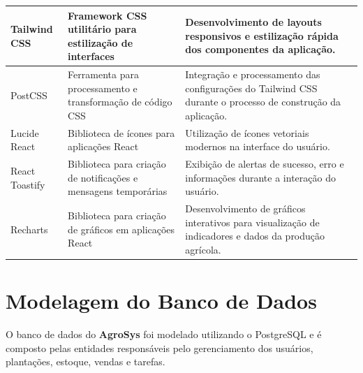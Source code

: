 \documentclass[12pt]{article}
\begin{document}
\begin{longtable}{|p{3cm}|p{4.2cm}|p{7cm}|}
  Tailwind CSS                                                                           &
  Framework CSS utilitário para estilização de interfaces                                &
  Desenvolvimento de layouts responsivos e estilização rápida dos componentes da aplicação.                                                    \\
  \hline

  PostCSS                                                                                &
  Ferramenta para processamento e transformação de código CSS                            &
  Integração e processamento das configurações do Tailwind CSS durante o processo de construção da aplicação.                                  \\
  \hline

  Lucide React                                                                           &
  Biblioteca de ícones para aplicações React                                             &
  Utilização de ícones vetoriais modernos na interface do usuário.                                                                             \\
  \hline

  React Toastify                                                                         &
  Biblioteca para criação de notificações e mensagens temporárias                        &
  Exibição de alertas de sucesso, erro e informações durante a interação do usuário.                                                           \\
  \hline

  Recharts                                                                         &
  Biblioteca para criação de gráficos em aplicações React                               &
  Desenvolvimento de gráficos interativos para visualização de indicadores e dados da produção agrícola. \\
  \hline

\end{longtable}


\section{Modelagem do Banco de Dados}

O banco de dados do \textbf{AgroSys} foi modelado utilizando o PostgreSQL e é composto pelas entidades responsáveis pelo gerenciamento dos usuários, plantações, estoque, vendas e tarefas.
\end{document}

